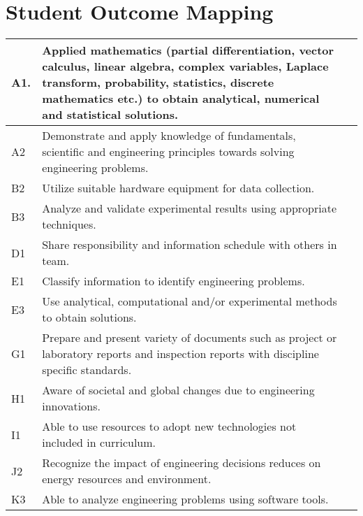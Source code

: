        \section{Student Outcome Mapping}
        	\begin{table}[h!]
        		\begin{tabular}{|m{0.75cm}|m{2.75in}|m{2.75in}|}\hline
        		A1.&Applied mathematics (partial differentiation, vector calculus, linear algebra, complex variables, Laplace transform, probability, statistics, discrete mathematics etc.) to obtain analytical, numerical and statistical solutions.&\\\hline
        		A2 & Demonstrate and apply knowledge of fundamentals, scientific and engineering principles towards solving engineering problems.&\\\hline
        		B2 & Utilize suitable hardware equipment for data collection.&\\\hline
        		B3 & Analyze and validate experimental results using appropriate techniques.&\\\hline
        		D1 & Share responsibility and information schedule with others in team.&\\\hline
        		E1 & Classify information to identify engineering problems.&\\\hline
        		E3 & Use analytical, computational and/or experimental methods to obtain solutions.&\\\hline
        		G1 & Prepare and present variety of documents such as project or laboratory reports and inspection reports with discipline specific standards.&\\\hline
        		H1 & Aware of societal and global changes due to engineering innovations.&\\\hline
        		I1 & Able to use resources to adopt new technologies not included in curriculum.&\\\hline
        		J2 & Recognize the impact of engineering decisions reduces on energy resources and environment.&\\\hline
        		K3 & Able to analyze engineering problems using software tools.&\\\hline
        		\end{tabular}
        	\end{table}
    